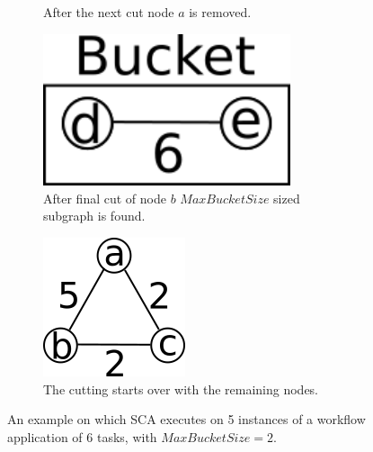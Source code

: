 \begin{figure}[!h]
\begin{subfigure}[b]{0.3\textwidth}
			 \caption{After the next cut node $a$ is removed.}
			 \label{fig:sca3}
	 \end{subfigure}
	 \hspace{3mm}
	 \begin{subfigure}[b]{0.3\textwidth}
			 \includegraphics[width=0.8\textwidth]{img/sca4.png}
			 \centering
			 \caption{After final cut of node $b$ $MaxBucketSize$ sized subgraph is found.}
			 \label{fig:sca4}
	 \end{subfigure}
	 \hspace{3mm}
	 \begin{subfigure}[b]{0.25\textwidth}
			 \includegraphics[width=\textwidth]{img/sca5.png}
			 \caption{The cutting starts over with the remaining nodes.}
			 \label{fig:sca5}
	 \end{subfigure}
	 
		\caption{An example on which SCA executes on 5 instances of a workflow application of 6 tasks, with $MaxBucketSize = 2$.}
		\label{fig:sca}
\end{figure}

